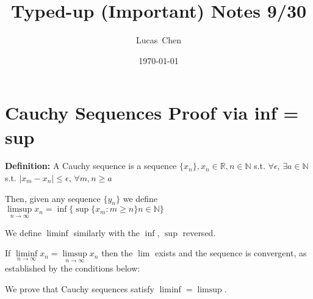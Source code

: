 \documentclass{amsart}
\title{Typed-up (Important) Notes 9/30}
\author{Lucas\ Chen}
\date{\today}
\begin{document}
\maketitle

\section{Cauchy Sequences Proof via inf = sup}

\textbf{Definition:} A Cauchy sequence is a sequence $\{x_n\}, x_n\in\mathbb{R}, n\in\mathbb{N}$ s.t. $\forall\epsilon$, $\exists a\in\mathbb{N}$ s.t. $|x_m-x_n|\leq \epsilon$, $\forall m, n \geq a$

Then, given any sequence $\{y_n\}$ we define $\limsup\limits_{n\rightarrow\infty} x_n= \inf\{\sup\{x_m:m\geq n\}n\in\mathbb{N}\}$

We define $\liminf$ similarly with the $\inf$, $\sup$ reversed.

If $\liminf\limits_{n\rightarrow\infty} x_n =\limsup\limits_{n\rightarrow\infty} x_n$ then the $\lim$ exists and the sequence is convergent, as established by the conditions below:

We prove that Cauchy sequences satisfy $\liminf = \limsup$.
\end{document}
